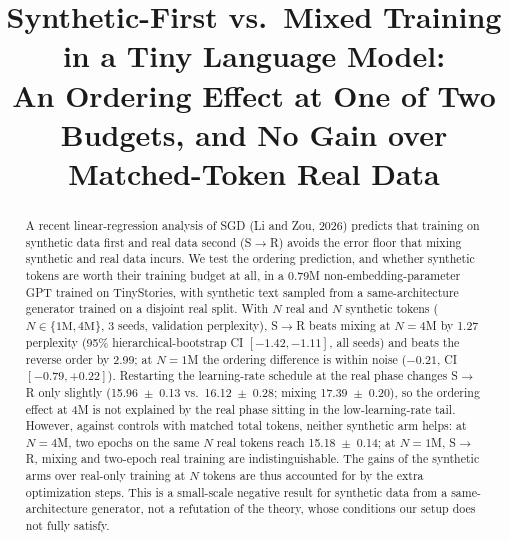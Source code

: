 \documentclass[conference]{IEEEtran}
\newcommand{\SR}{S$\to$R}
\begin{document}
\title{Synthetic-First vs.\ Mixed Training in a Tiny Language Model:\\
An Ordering Effect at One of Two Budgets, and No Gain over Matched-Token Real Data}

\author{
}

\maketitle


\begin{abstract}
A recent linear-regression analysis of SGD (Li and Zou, 2026) predicts that training on synthetic data first and real data second (\SR) avoids the error floor that mixing synthetic and real data incurs. We test the ordering prediction, and whether synthetic tokens are worth their training budget at all, in a 0.79M non-embedding-parameter GPT trained on TinyStories, with synthetic text sampled from a same-architecture generator trained on a disjoint real split. With $N$ real and $N$ synthetic tokens ($N\in\{1\text{M},4\text{M}\}$, 3 seeds, validation perplexity), \SR{} beats mixing at $N{=}4$M by 1.27 perplexity (95\% hierarchical-bootstrap CI $[-1.42,-1.11]$, all seeds) and beats the reverse order by 2.99; at $N{=}1$M the ordering difference is within noise ($-0.21$, CI $[-0.79,+0.22]$). Restarting the learning-rate schedule at the real phase changes \SR{} only slightly (15.96~$\pm$~0.13 vs.\ 16.12~$\pm$~0.28; mixing 17.39~$\pm$~0.20), so the ordering effect at 4M is not explained by the real phase sitting in the low-learning-rate tail. However, against controls with matched total tokens, neither synthetic arm helps: at $N{=}4$M, two epochs on the same $N$ real tokens reach 15.18~$\pm$~0.14; at $N{=}1$M, \SR{}, mixing and two-epoch real training are indistinguishable. The gains of the synthetic arms over real-only training at $N$ tokens are thus accounted for by the extra optimization steps. This is a small-scale negative result for synthetic data from a same-architecture generator, not a refutation of the theory, whose conditions our setup does not fully satisfy.
\end{abstract}
\end{document}
